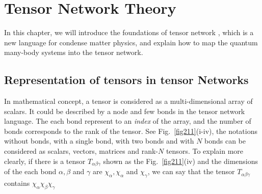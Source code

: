 \chapter{Tensor Network Theory} 
In this chapter, we will introduce the foundations of tensor network \cite{jordan_studies_2011,Orus2014117,bauer_tensor_2011}, which is a new language for condense matter physics, and explain how to map the quantum many-body systems into the tensor network. 

\section{Representation of tensors in tensor Networks}
\label{notations}

In mathematical concept, a tensor is considered as a multi-dimensional array of scalars. It could be described by a node and few bonds in the tensor network language. The each bond represent to an \textit{index} of the array, and the number of bonds corresponds to the rank of the tensor. See Fig.~\ref{fig211}(i-iv), the notations without bonds, with a single bond, with two bonds and with $N$ bonds can be considered as scalars, vectors, matrices and rank-$N$ tensors. To explain more clearly, if there is a tensor $T_{\alpha \beta \gamma}$ shown as the Fig.~\ref{fig211}(iv) and the dimensions of the each bond $\alpha, \beta$ and $\gamma$ are $\chi_{\alpha},\chi_{\alpha}$ and $\chi_{\gamma}$, we can say that the tensor $T_{\alpha \beta \gamma}$ contains $\chi_{\alpha}\chi_{\beta}\chi_{\gamma}$


